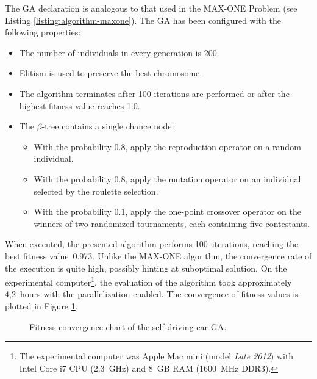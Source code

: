 The GA declaration is analogous to that used in the MAX-ONE Problem (see Listing \ref{listing:algorithm-maxone}). The GA has been configured with the following properties:
~
\begin{itemize}
	\item The number of individuals in every generation is 200.
	\item Elitism is used to preserve the best chromosome.
	\item The algorithm terminates after 100 iterations are performed or after the highest fitness value reaches 1.0.
	\item The $\beta$-tree contains a single chance node:
	~
	\begin{itemize}
		\item With the probability 0.8, apply the reproduction operator on a random individual.
		\item With the probability 0.8, apply the mutation operator on an individual selected by the roulette selection.
		\item With the probability 0.1, apply the one-point crossover operator on the winners of two randomized tournaments, each containing five contestants.
	\end{itemize}
\end{itemize}

When executed, the presented algorithm performs 100~iterations, reaching the best fitness value~0.973. Unlike the MAX-ONE algorithm, the convergence rate of the execution is quite high, possibly hinting at suboptimal solution. On the experimental computer\footnote{The experimental computer was Apple Mac mini (model \textit{Late 2012}) with Intel Core i7 CPU (2.3~GHz) and 8~GB RAM (1600~MHz DDR3).}, the evaluation of the algorithm took approximately 4,2~hours with the parallelization enabled. The convergence of fitness values is plotted in Figure \ref{fig:car-fitness}.

\begin{figure}[ht]
	\centering
	\caption{Fitness convergence chart of the self-driving car GA.}
	\label{fig:car-fitness}
\end{figure}

